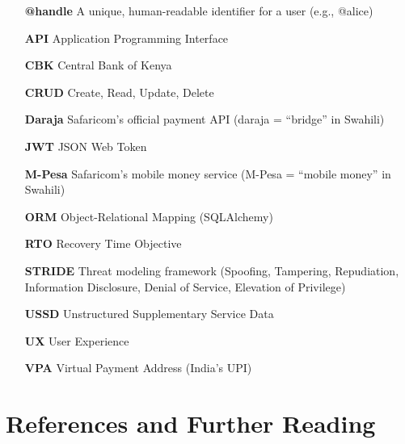 \documentclass[12pt, a4paper, twoside, openright]{report}
\begin{document}
\begin{itemize}
    \item[\textbf{@handle}] A unique, human-readable identifier for a user (e.g., @alice)
    \item[\textbf{API}] Application Programming Interface
    \item[\textbf{CBK}] Central Bank of Kenya
    \item[\textbf{CRUD}] Create, Read, Update, Delete
    \item[\textbf{Daraja}] Safaricom's official payment API (daraja = ``bridge'' in Swahili)
    \item[\textbf{JWT}] JSON Web Token
    \item[\textbf{M-Pesa}] Safaricom's mobile money service (M-Pesa = ``mobile money'' in Swahili)
    \item[\textbf{ORM}] Object-Relational Mapping (SQLAlchemy)
    \item[\textbf{RTO}] Recovery Time Objective
    \item[\textbf{STRIDE}] Threat modeling framework (Spoofing, Tampering, Repudiation, Information Disclosure, Denial of Service, Elevation of Privilege)
    \item[\textbf{USSD}] Unstructured Supplementary Service Data
    \item[\textbf{UX}] User Experience
    \item[\textbf{VPA}] Virtual Payment Address (India's UPI)
\end{itemize}

\chapter{References and Further Reading}
\end{document}
